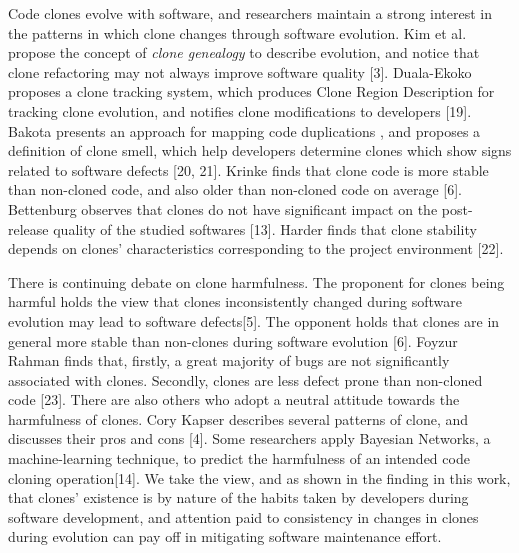 Code clones evolve with software, and researchers maintain a strong interest in the patterns in which clone changes through software evolution. Kim et al. propose the concept of {\em clone genealogy} to describe evolution, and notice that clone refactoring may not always improve software quality [3]. %
Duala-Ekoko proposes a clone tracking system, which produces Clone Region Description for tracking clone evolution, and notifies clone modifications to developers [19]. Bakota presents an approach for mapping code duplications%
, and proposes a definition of clone smell, which help developers determine clones which show signs related to software defects [20, 21]. Krinke finds that clone code is more stable than non-cloned code, and also older than non-cloned code on average [6]. Bettenburg observes that %
clones do not have significant impact on the post-release quality of the studied softwares [13]. Harder finds that clone stability depends on clones' characteristics corresponding to the project environment [22].

There is continuing debate on clone harmfulness. The proponent for clones being harmful holds the view that %
clones inconsistently changed during software evolution may lead to software defects[5]. The opponent holds that clones are in general more stable than non-clones during software evolution [6]. Foyzur Rahman %
finds that, firstly, a great majority of bugs are not significantly associated with clones. Secondly, clones are less defect prone than non-cloned code [23]. There are also others who adopt a neutral attitude towards the harmfulness of clones. Cory Kapser describes several patterns of clone, and discusses their pros and cons [4]. Some researchers apply Bayesian Networks, a machine-learning technique, to predict the harmfulness of an intended code cloning operation[14]. We take the view, and as shown in the finding in this work, that clones' existence is by nature of the habits taken by developers during software development, and attention paid to consistency in changes in clones during evolution can pay off in mitigating software maintenance effort. 

